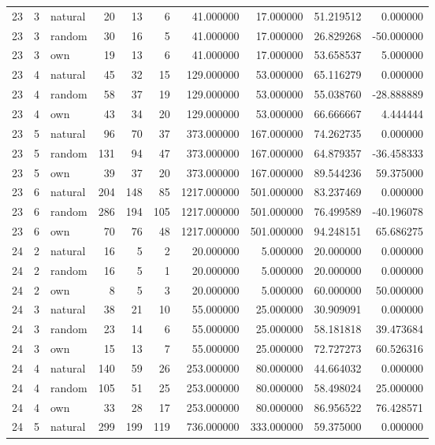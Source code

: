 \begin{table}[htbp]
\begin{tabular}{rrlrrrrrrr}
23 & 3 & natural & 20 & 13 & 6 & 41.000000 & 17.000000 & 51.219512 & 0.000000 \\
23 & 3 & random & 30 & 16 & 5 & 41.000000 & 17.000000 & 26.829268 & -50.000000 \\
23 & 3 & own & 19 & 13 & 6 & 41.000000 & 17.000000 & 53.658537 & 5.000000 \\
23 & 4 & natural & 45 & 32 & 15 & 129.000000 & 53.000000 & 65.116279 & 0.000000 \\
23 & 4 & random & 58 & 37 & 19 & 129.000000 & 53.000000 & 55.038760 & -28.888889 \\
23 & 4 & own & 43 & 34 & 20 & 129.000000 & 53.000000 & 66.666667 & 4.444444 \\
23 & 5 & natural & 96 & 70 & 37 & 373.000000 & 167.000000 & 74.262735 & 0.000000 \\
23 & 5 & random & 131 & 94 & 47 & 373.000000 & 167.000000 & 64.879357 & -36.458333 \\
23 & 5 & own & 39 & 37 & 20 & 373.000000 & 167.000000 & 89.544236 & 59.375000 \\
23 & 6 & natural & 204 & 148 & 85 & 1217.000000 & 501.000000 & 83.237469 & 0.000000 \\
23 & 6 & random & 286 & 194 & 105 & 1217.000000 & 501.000000 & 76.499589 & -40.196078 \\
23 & 6 & own & 70 & 76 & 48 & 1217.000000 & 501.000000 & 94.248151 & 65.686275 \\
24 & 2 & natural & 16 & 5 & 2 & 20.000000 & 5.000000 & 20.000000 & 0.000000 \\
24 & 2 & random & 16 & 5 & 1 & 20.000000 & 5.000000 & 20.000000 & 0.000000 \\
24 & 2 & own & 8 & 5 & 3 & 20.000000 & 5.000000 & 60.000000 & 50.000000 \\
24 & 3 & natural & 38 & 21 & 10 & 55.000000 & 25.000000 & 30.909091 & 0.000000 \\
24 & 3 & random & 23 & 14 & 6 & 55.000000 & 25.000000 & 58.181818 & 39.473684 \\
24 & 3 & own & 15 & 13 & 7 & 55.000000 & 25.000000 & 72.727273 & 60.526316 \\
24 & 4 & natural & 140 & 59 & 26 & 253.000000 & 80.000000 & 44.664032 & 0.000000 \\
24 & 4 & random & 105 & 51 & 25 & 253.000000 & 80.000000 & 58.498024 & 25.000000 \\
24 & 4 & own & 33 & 28 & 17 & 253.000000 & 80.000000 & 86.956522 & 76.428571 \\
24 & 5 & natural & 299 & 199 & 119 & 736.000000 & 333.000000 & 59.375000 & 0.000000 \\

\end{tabular}
\end{table}
